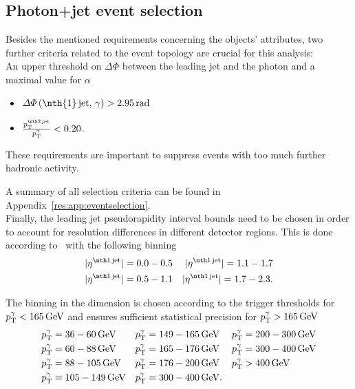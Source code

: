 \subsection{Photon+jet event selection}
Besides the mentioned requirements concerning the objects' attributes, two further criteria related to the event topology are crucial for this analysis:\\
An upper threshold on $\Delta \Phi$ between the leading jet and the photon and a maximal value for $\alpha$
\begin{itemize}
 \item $\Delta \Phi \left(\text{\nth{1}\,jet},\,\gamma \right) > 2.95\,\unit{rad}$
 \item $\frac{\ptsecondjet}{\ptgamma} < 0.20$.
\end{itemize}
These requirements are important to suppress events with too much further hadronic activity.

A summary of all selection criteria can be found in Appendix~\ref{res:app:eventselection}.\\

Finally, the leading jet pseudorapidity interval bounds need to be chosen in order to account for resolution differences in different detector regions.
This is done according to~\cite{bib:Matthias_Thesis} with the following binning
\begin{align*}
|\etafirstjet| = 0.0-0.5 && |\etafirstjet| = 1.1-1.7 \\
|\etafirstjet| = 0.5-1.1 && |\etafirstjet| = 1.7-2.3.
\end{align*}

The binning in the \ptgamma dimension is chosen according to the trigger thresholds for \mbox{${p}_\mathrm{T}^{\gamma}<165\,\text{Ge}\kern-0.06667em\text{V}$} and ensures sufficient statistical precision for \mbox{${p}_\mathrm{T}^{\gamma}>165\,\text{Ge}\kern-0.06667em\text{V}$}
\begin{align*}
{p}_\mathrm{T}^{\gamma} &= 36 -60\,\text{Ge}\kern-0.06667em\text{V}     &  {p}_\mathrm{T}^{\gamma} &= 149-165\,\text{Ge}\kern-0.06667em\text{V}  & {p}_\mathrm{T}^{\gamma} &= 200-300\,\text{Ge}\kern-0.06667em\text{V}\\
{p}_\mathrm{T}^{\gamma} &= 60 -88\,\text{Ge}\kern-0.06667em\text{V}     &  {p}_\mathrm{T}^{\gamma} &= 165-176\,\text{Ge}\kern-0.06667em\text{V}  & {p}_\mathrm{T}^{\gamma} &= 300-400\,\text{Ge}\kern-0.06667em\text{V}\\
{p}_\mathrm{T}^{\gamma} &= 88 -105\,\text{Ge}\kern-0.06667em\text{V}    &  {p}_\mathrm{T}^{\gamma} &= 176-200\,\text{Ge}\kern-0.06667em\text{V}  & {p}_\mathrm{T}^{\gamma} &> 400\,\text{Ge}\kern-0.06667em\text{V}\\
{p}_\mathrm{T}^{\gamma} &= 105-149\,\text{Ge}\kern-0.06667em\text{V}    &  {p}_\mathrm{T}^{\gamma}  &= 300-400\,\text{Ge}\kern-0.06667em\text{V}. & \\
\end{align*}



